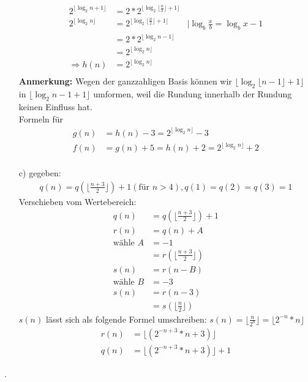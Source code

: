 \documentclass[ngerman,a4paper]{report}
\begin{document}
\begin{enumerate}
\begin{align*}
2^{\lfloor \log_2 n +1 \rfloor} &= 2*2^{\lfloor \log_2 \lfloor{\frac{n}{2}}\rfloor +1\rfloor}\\
2^{\lfloor \log_2 n \rfloor} &= 2^{\lfloor \log_2\lfloor \frac{n}{2}\rfloor+1\rfloor}&| \log_b \frac{x}{b} = \log_b x -1\\
&= 2 * 2^{\lfloor \log_2 n-1\rfloor} \\
&= 2^{\lfloor \log_2 n\rfloor}\\
\Rightarrow h(n) &= 2^{\lfloor \log_2 n\rfloor}\\
\end{align*}
\textbf{Anmerkung: }Wegen der ganzzahligen Basis können wir $\lfloor \log_2 \lfloor n-1 \rfloor +1\rfloor$ in $\lfloor \log_2  n-1  +1\rfloor$ umformen, weil die Rundung innerhalb der Rundung keinen Einfluss hat.\\
Formeln für
\begin{align*}
g(n) &= h(n)-3 = 2^{\lfloor \log_2 n\rfloor}-3\\
f(n) &= g(n)+5 = h(n) + 2 = 2^{\lfloor \log_2 n\rfloor} + 2\\
\end{align*}
\item[c)] gegeben:
\begin{align*}
q(n) = q (\lfloor \frac{n+3}{2} \rfloor) +1 (\text{für } n > 4), q(1) = q(2) = q (3) = 1
\end{align*}
Verschieben vom Wertebereich:
\begin{align*}
q(n) &= q (\lfloor \frac{n+3}{2} \rfloor) +1\\
r(n) &= q(n)+A\\
\text{wähle } A &= -1\\
&= r(\lfloor \frac{n+3}{2} \rfloor)\\
s(n) &= r(n-B)\\
\text{wähle } B &= -3\\
s(n) &= r(n-3)\\
&= s(\lfloor \frac{n}{2} \rfloor)
\end{align*}
$s(n)$ lässt sich als folgende Formel umschreiben: $s(n) = \lfloor \frac{n}{2^n} \rfloor = \lfloor 2^{-n} * n \rfloor$
\begin{align*}
r(n) &= \lfloor (2^{-n+3} * n+3) \rfloor\\
q(n) &= \lfloor (2^{-n+3} * n+3) \rfloor+1
\end{align*}
\end{enumerate}







\newpage





.
\end{document}
